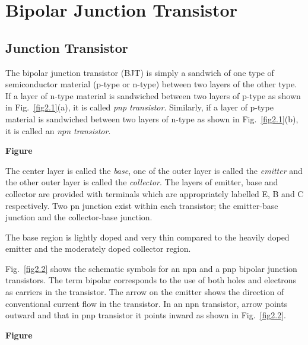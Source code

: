 \makeatletter
\def\@makechapterhead#1{%
  \vspace*{10\p@}%
  {\parindent \z@ \raggedleft \normalfont
    \ifnum \c@secnumdepth >\m@ne
      \if@mainmatter
        \LARGE\bfseries \@chapapp\space \thechapter
	\vskip 4pt
        \hrule height 2pt
        \par\nobreak
        \vskip 5\p@
      \fi
    \fi
    \interlinepenalty\@M
    \huge \bfseries #1\par\nobreak
\vskip 5pt

\hrule height 2pt   
 \vskip 10\p@  
  }}
\makeatother

\chapter{Bipolar Junction Transistor}\label{chap2}

\medskip
\section{Junction Transistor}\label{sec2.1}

The bipolar junction transistor (BJT) is simply a sandwich of one type of semiconductor material (p-type or n-type) between two layers of the other type. If a layer of n-type material is sandwiched between two layers of p-type as shown in Fig.~\ref{fig2.1}(a), it is called {\em pnp transistor}. Similarly, if a layer of p-type material is sandwiched between two layers of n-type as shown in Fig.~\ref{fig2.1}(b), it is called an {\em npn transistor}.
\begin{center}
{\bf Figure}
\end{center}

The center layer is called the {\em base}, one of the outer layer is called the {\em emitter} and the other outer layer is called the {\em collector}. The layers of emitter, base and collector are provided with terminals which are appropriately labelled E, B and C respectively. Two pn junction exist within each transistor; the emitter-base junction and the collector-base junction.

The base region is lightly doped and very thin compared to the heavily doped emitter and the moderately doped collector region.

Fig.~\ref{fig2.2} shows the schematic symbols for an npn and a pnp bipolar junction transistors. The term bipolar corresponds to the use of both holes and electrons as carriers in the transistor. The arrow on the emitter shows the direction of conventional current flow in the transistor. In an npn transistor, arrow points outward and that in pnp transistor it points inward as shown in Fig.~\ref{fig2.2}.
\begin{center}
{\bf Figure}
\end{center}

